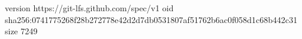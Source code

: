 version https://git-lfs.github.com/spec/v1
oid sha256:0741775268f28b272778e42d2d7db0531807af51762b6ac0f058d1c68b442c31
size 7249
